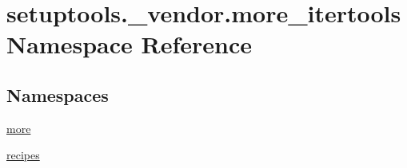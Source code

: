 \hypertarget{namespacesetuptools_1_1__vendor_1_1more__itertools}{}\section{setuptools.\+\_\+vendor.\+more\+\_\+itertools Namespace Reference}
\label{namespacesetuptools_1_1__vendor_1_1more__itertools}
\subsection*{Namespaces}
\begin{DoxyCompactItemize}
\item 
 \hyperlink{namespacesetuptools_1_1__vendor_1_1more__itertools_1_1more}{more}
\item 
 \hyperlink{namespacesetuptools_1_1__vendor_1_1more__itertools_1_1recipes}{recipes}
\end{DoxyCompactItemize}
